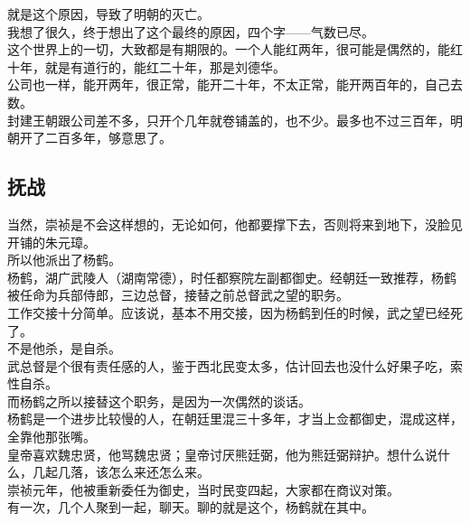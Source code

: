 \begin{multicols}{\theparacolNo}
就是这个原因，导致了明朝的灭亡。\\

我想了很久，终于想出了这个最终的原因，四个字——气数已尽。\\

这个世界上的一切，大致都是有期限的。一个人能红两年，很可能是偶然的，能红十年，就是有道行的，能红二十年，那是刘德华。\\

公司也一样，能开两年，很正常，能开二十年，不太正常，能开两百年的，自己去数。\\

封建王朝跟公司差不多，只开个几年就卷铺盖的，也不少。最多也不过三百年，明朝开了二百多年，够意思了。\\

\subsection{抚战}
当然，崇祯是不会这样想的，无论如何，他都要撑下去，否则将来到地下，没脸见开铺的朱元璋。\\

所以他派出了杨鹤。\\

杨鹤，湖广武陵人（湖南常德），时任都察院左副都御史。经朝廷一致推荐，杨鹤被任命为兵部侍郎，三边总督，接替之前总督武之望的职务。\\

工作交接十分简单。应该说，基本不用交接，因为杨鹤到任的时候，武之望已经死了。\\

不是他杀，是自杀。\\

武总督是个很有责任感的人，鉴于西北民变太多，估计回去也没什么好果子吃，索性自杀。\\

而杨鹤之所以接替这个职务，是因为一次偶然的谈话。\\

杨鹤是一个进步比较慢的人，在朝廷里混三十多年，才当上佥都御史，混成这样，全靠他那张嘴。\\

皇帝喜欢魏忠贤，他骂魏忠贤；皇帝讨厌熊廷弼，他为熊廷弼辩护。想什么说什么，几起几落，该怎么来还怎么来。\\

崇祯元年，他被重新委任为御史，当时民变四起，大家都在商议对策。\\

有一次，几个人聚到一起，聊天。聊的就是这个，杨鹤就在其中。\\


\end{multicols}
